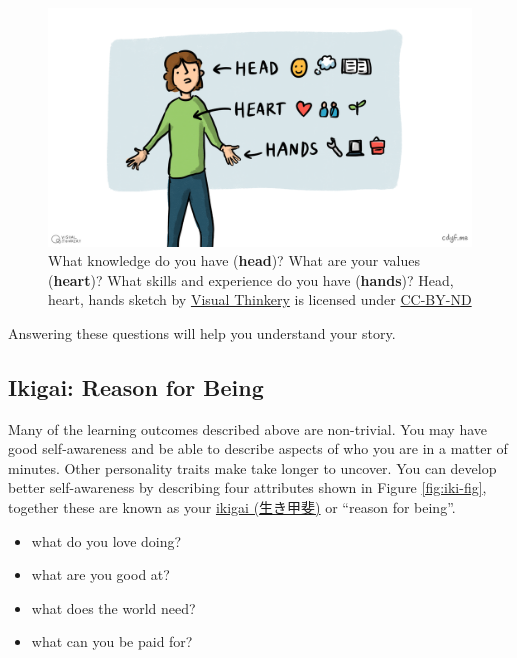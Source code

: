 \documentclass[
]{book}
\providecommand{\tightlist}{%
  \setlength{\itemsep}{0pt}\setlength{\parskip}{0pt}}
\begin{document}
\begin{figure}

{\centering \includegraphics[width=1\linewidth]{images/Head, heart and hands} 

}

\caption{What knowledge do you have (\textbf{head})? What are your values (\textbf{heart})? What skills and experience do you have (\textbf{hands})? Head, heart, hands sketch by \href{https://visualthinkery.com/}{Visual Thinkery} is licensed under \href{https://creativecommons.org/licenses/by-nd/4.0/}{CC-BY-ND}}\label{fig:headhearthands-fig}
\end{figure}



Answering these questions will help you understand your story.

\hypertarget{no42}{%
\subsection{Ikigai: Reason for Being}\label{no42}}

Many of the learning outcomes described above are non-trivial. You may have good self-awareness and be able to describe aspects of who you are in a matter of minutes. Other personality traits make take longer to uncover. You can develop better self-awareness by describing four attributes shown in Figure \ref{fig:iki-fig}, together these are known as your \href{https://en.wikipedia.org/wiki/Ikigai}{ikigai (生き甲斐)} or ``reason for being''.

\begin{itemize}
\tightlist
\item
  what do you love doing?
\item
  what are you good at?
\item
  what does the world need?
\item
  what can you be paid for?
\end{itemize}
\end{document}
